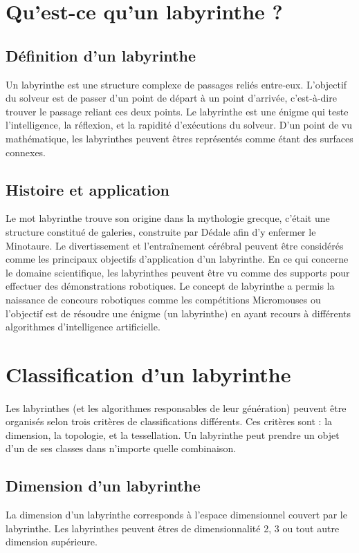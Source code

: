 \section{Qu'est-ce qu'un labyrinthe ?}
\subsection{Définition d'un labyrinthe}
Un labyrinthe est une structure complexe de passages reliés entre-eux. L’objectif du solveur est de passer d'un point de départ à un point d'arrivée, c'est-à-dire trouver le passage reliant ces deux points. Le labyrinthe est une énigme qui teste l'intelligence, la réflexion, et la rapidité d'exécutions du solveur. D'un point de vu mathématique, les labyrinthes peuvent êtres représentés comme étant des surfaces connexes. 


\subsection{Histoire et application}
Le mot labyrinthe trouve son origine dans la  mythologie grecque, c'était une structure constitué de galeries, construite par Dédale afin d'y enfermer le Minotaure.
Le divertissement et l'entraînement cérébral peuvent être considérés comme les principaux objectifs d'application d'un labyrinthe.
En ce qui concerne le domaine scientifique, les labyrinthes peuvent être vu comme des supports pour effectuer des démonstrations robotiques. Le concept de labyrinthe a permis la naissance de concours robotiques comme les compétitions Micromouses ou l'objectif est de résoudre une énigme (un labyrinthe) en ayant recours à différents algorithmes d'intelligence artificielle.
\section{Classification d'un labyrinthe} 
\label{sec:ProblematiqueConstructionLabyrinthe}
\paragraph{}
Les labyrinthes (et les algorithmes responsables de leur génération) peuvent être organisés selon trois critères de  classifications différents. Ces critères sont : la dimension, la topologie, et la tessellation. Un labyrinthe peut prendre un objet d'un de ses classes dans n'importe quelle combinaison.

\subsection{Dimension d'un labyrinthe}
La dimension d'un labyrinthe corresponds à l'espace dimensionnel couvert par le labyrinthe. Les labyrinthes peuvent êtres de dimensionnalité 2, 3 ou tout autre dimension supérieure.

